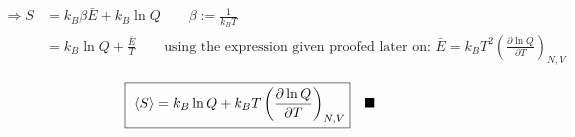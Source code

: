 \documentclass{article}
\begin{document}
\begin{enumerate}
    \begin{align*}
        \Rightarrow S &= k_B \beta \bar{E} + k_B \ln Q \qquad \beta := \frac{1}{k_B T} \\
        &= k_B \ln Q + \frac{\bar{E}}{T} \qquad \text{using the expression given proofed later on: } \bar{E} = k_B T^2 \left( \frac{\partial \ln Q}{\partial T} \right)_{N,V}
    \end{align*}

    \vspace{0.3cm}
    \begin{equation*}
        \text{\fbox{\rule[-0.3cm]{0cm}{0.8cm} $\displaystyle \langle S \rangle = k_B \ln Q + k_B T \left( \frac{\partial \ln Q}{\partial T} \right)_{N,V}$}} \quad \blacksquare
    \end{equation*}
\end{enumerate}

\end{document}
